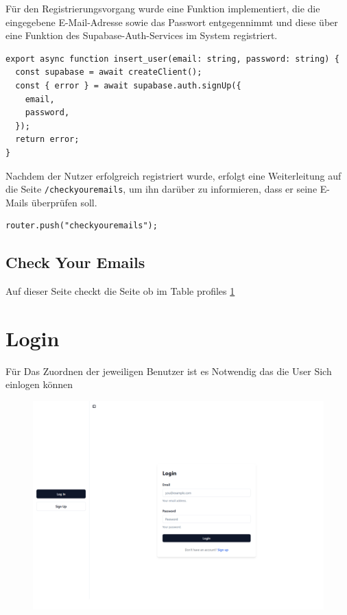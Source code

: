 \begin{inhalt}
Für den Registrierungsvorgang wurde eine Funktion implementiert, die die eingegebene E-Mail-Adresse sowie das Passwort entgegennimmt und diese über eine Funktion des Supabase-Auth-Services im System registriert.


\begin{lstlisting}[style=mytsx]
export async function insert_user(email: string, password: string) {
  const supabase = await createClient();
  const { error } = await supabase.auth.signUp({
    email,
    password,
  });
  return error;
}
\end{lstlisting}

Nachdem der Nutzer erfolgreich registriert wurde, erfolgt eine Weiterleitung auf die Seite \texttt{/checkyouremails}, um ihn darüber zu informieren, dass er seine E-Mails überprüfen soll.

\begin{lstlisting}[style=mytsx]
      router.push("checkyouremails");
\end{lstlisting}

\subsection{Check Your Emails}

Auf dieser Seite checkt die Seite ob im Table profiles \ref{}


\section{Login}
Für Das Zuordnen der jeweiligen Benutzer ist es Notwendig das die User Sich einlogen können

\begin{figure}[!htb]
\centering
\includegraphics[width=1\textwidth]{files/Thomas/pics/Website/Login/login-screen.png}
\caption[Bildbezeichnung für Abbildungsverzeichnis]{}
\label{fig:gehaeuse_internet_bild}
\end{figure}


\end{inhalt}
